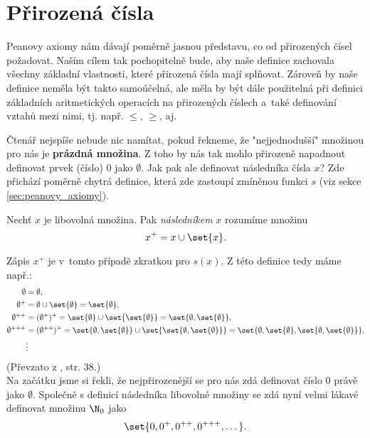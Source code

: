 \section{Přirozená čísla}\label{sec:prirozena_cisla}
Peanovy axiomy nám dávají poměrně jasnou představu, co od přirozených čísel požadovat. Naším cílem tak pochopitelně bude, aby naše definice zachovala všechny základní vlastnosti, které přirozená čísla mají splňovat. Zároveň by naše definice neměla být takto samoúčelná, ale měla by být dále použitelná při definici základních aritmetických operacích na přirozených číslech a~také definování vztahů mezi nimi, tj. např. $\leq$, $\geq$, aj.\par
Čtenář nejspíše nebude nic namítat, pokud řekneme, že "nejjednodušší" množinou pro nás je \textbf{prázdná množina}. Z toho by nás tak mohlo přirozeně napadnout definovat prvek (číslo) 0 jako $\emptyset$. Jak pak ale definovat následníka čísla $x$? Zde přichází poměrně chytrá definice, která zde zastoupí zmíněnou funkci $s$ (viz sekce \ref{sec:peanovy_axiomy}).
\begin{definition}[Následník]\label{def:naslednik}
    Nechť $x$ je libovolná množina. Pak \emph{následníkem} $x$ rozumíme množinu
    \begin{equation*}
        x^+=x\cup\set{x}.
    \end{equation*}
\end{definition}
Zápis $x^+$ je v~tomto případě zkratkou pro $s(x)$. Z této definice tedy máme např.:
\begin{align*}
    \emptyset&=\emptyset,\\
    \emptyset^+&=\emptyset\cup\set{\emptyset}=\set{\emptyset},\\
    \emptyset^{++}&=(\emptyset^+)^+=\set{\emptyset}\cup\set{\set{\emptyset}}=\set{\emptyset,\set{\emptyset}},\\
    \emptyset^{+++}&=(\emptyset^{++})^+=\set{\emptyset,\set{\emptyset}}\cup\set{\set{\emptyset,\set{\emptyset}}}=\set{\emptyset,\set{\emptyset},\set{\emptyset,\set{\emptyset}}},\\
    &\vdots
\end{align*}
(Převzato z \cite{Goldrei2017}, str. 38.)\\
Na začátku jsme si řekli, že nejpřirozenější se pro nás zdá definovat číslo 0 právě jako $\emptyset$. Společně s definicí následníka libovolné množiny se zdá nyní velmi lákavé definovat množinu $\N_0$ jako
\begin{equation*}
    \set{0,0^+,0^{++},0^{+++},\dots}.
\end{equation*}
